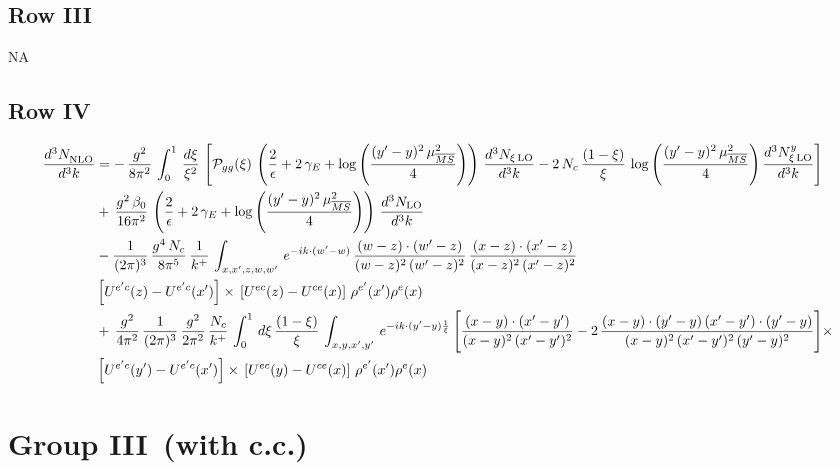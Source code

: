 \documentclass[9pt]{article}
\numberwithin{equation}{section}
\begin{document}
\subsection{Row III}
\textsc{NA}
\subsection{Row IV}
\begin{align}
    \frac{d^{3}N_{\rm NLO}^{\rm}}{d^{3}k}  & =  
    -\,\frac{g^{2}}{8\pi^{2}}\,\int_{0}^{1}\, \frac{d\xi}{\xi^{2}}\,\left[\mathcal{P}_{gg}(\xi)\,\left(\frac{2}{\epsilon}+2\,\gamma_{E}+\log{\left(\frac{(y'-y)^{2}\,\mu^{2}_{\overline{MS}}}{4}\right)}\right)\,\frac{d^{3}N_{\xi\,\rm LO}}{d^{3}k}-2\,N_{c}\,\frac{(1-\xi)}{\xi}\,\log{\left(\frac{(y'-y)^{2}\,\mu^{2}_{\overline{MS}}}{4}\right)}\,\frac{d^{3}N^{y}_{\xi\,\rm LO}}{d^{3}k} \right]\notag \\ & +\,\frac{g^{2}\,\beta_{0}}{16\pi^{2}}\,\left(\frac{2}{\epsilon}+2\,\gamma_{E}+\log{\left(\frac{(y'-y)^{2}\,\mu^{2}_{\overline{MS}}}{4}\right)}\right)\,\frac{d^{3}N_{\rm LO}}{d^{3}k}\notag \\ &
    -\frac{1}{(2\pi)^{3}}\,\frac{g^{4}\,N_{c}}{8\pi^{5}}\,\frac{1}{k^{+}}\,\int_{x,x',z,w,w'}\,e^{-ik\cdot (w'-w)}\,\frac{(w-z)\cdot(w'-z)}{(w-z)^{2}\,(w'-z)^{2}}\,\frac{(x-z)\cdot(x'-z)}{(x-z)^{2}\,(x'-z)^{2}}\notag \\
& \left[U^{e'c}(z) - U^{e'c}(x')\right] \times\, \left[U^{ec}(z) - U^{ce}(x)\right]\, \rho^{e'}(x') \rho^{e}(x) \notag \\
&  +\,\frac{g^{2}}{4\pi^{2}}\, \frac{1}{(2\pi)^{3}}\,\frac{g^{2}}{2\pi^{2}}\, \frac{N_{c}}{k^{+}}\,\int_{0}^{1}\,d\xi\, \frac{(1-\xi)}{\xi}\, \int_{x,y,x',y'}\,e^{-ik\cdot (y'-y)\frac{1}{\xi}}\,\Bigg[\frac{(x-y)\cdot (x'-y')}{(x-y)^{2}\, (x'-y')^{2}} -2\,\frac{(x-y)\cdot (y'-y)\, (x'-y')\cdot (y'-y)}{(x-y)^{2}\,(x'-y')^{2}\,(y'-y)^{2}}\Bigg]\times\notag \\ &  \left[U^{e'c}(y') - U^{e'c}(x')\right] \times\, \left[U^{ec}(y) - U^{ce}(x)\right]\, \rho^{e'}(x') \rho^{e}(x)
\end{align}
\section{Group III\, (with c.c.)}
\end{document}
